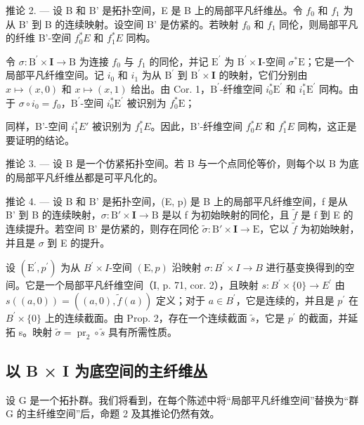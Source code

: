 推论 2. --- 设 B 和 B' 是拓扑空间，E 是 B 上的局部平凡纤维丛。令 \(f_0\) 和 \(f_1\) 为从 B' 到 B 的连续映射。设空间 B' 是仿紧的。若映射 \(f_0\) 和 \(f_1\) 同伦，则局部平凡的纤维 B'-空间 \(f_0^*E\) 和 \(f_1^*E\) 同构。

令 \(\sigma\colon\mathrm{B}^{\prime}\times\mathbf{I}\to\mathrm{B}\) 为连接 \(f_{0}\) 与 \(f_{1}\) 的同伦，并记 \(\mathrm{E}^{\prime}\) 为 \(\mathrm{B}^{\prime}\times\mathbf{I}\)-空间 \(\sigma^{*}\mathrm{E}\)；它是一个局部平凡纤维空间。记 \(i_{0}\) 和 \(i_{1}\) 为从 \(\mathrm{B}^{\prime}\) 到 \(\mathrm{B}^{\prime}\times\mathbf{I}\) 的映射，它们分别由 \(x\mapsto(x,0)\) 和 \(x\mapsto(x,1)\) 给出。由 Cor. 1，\(\mathrm{B}^{\prime}\)-纤维空间 \(i_{0}^{*}\mathrm{E}^{\prime}\) 和 \(i_{1}^{*}\mathrm{E}^{\prime}\) 同构。由于 \(\sigma\circ i_{0}=f_{0}\)，\(\mathrm{B}^{\prime}\)-空间 \(i_{0}^{*}\mathrm{E}^{\prime}\) 被识别为 \(f_{0}^{*}\mathrm{E}\)；

同样，B'-空间 \(i_{1}^{*}E'\) 被识别为 \(f_{1}^{*}E\)。因此，B'-纤维空间 \(f_{0}^{*}E\) 和 \(f_{1}^{*}E\) 同构，这正是要证明的结论。

推论 3. --- 设 B 是一个仿紧拓扑空间。若 B 与一个点同伦等价，则每个以 B 为底的局部平凡纤维丛都是可平凡化的。

推论 4. --- 设 B 和 B' 是拓扑空间，(E, p) 是 B 上的局部平凡纤维空间，f 是从 B' 到 B 的连续映射，\(\sigma: \mathrm{B}' \times \mathbf{I} \to \mathrm{B}\) 是以 f 为初始映射的同伦，且 \(\widetilde{f}\) 是 f 到 E 的连续提升。若空间 B' 是仿紧的，则存在同伦 \(\widetilde{\sigma}: \mathrm{B}' \times \mathbf{I} \to \mathrm{E}\)，它以 \(\widetilde{f}\) 为初始映射，并且是 \(\sigma\) 到 E 的提升。

设 \((\mathrm{E}^{\prime},p^{\prime})\) 为从 \(B^{\prime}\times I\)-空间 \((\mathrm{E},p)\) 沿映射 \(\sigma\colon B^{\prime}\times I\to B\) 进行基变换得到的空间。它是一个局部平凡纤维空间（I, p. 71, cor. 2），且映射 \(s\colon B^{\prime}\times\{0\}\to E^{\prime}\) 由 \(s((a,0))=((a,0),\widetilde{f}(a))\) 定义；对于 \(a\in B^{\prime}\)，它是连续的，并且是 \(p^{\prime}\) 在 \(B^{\prime}\times\{0\}\) 上的连续截面。由 Prop. 2，存在一个连续截面 \(\widetilde{s}\)，它是 \(p^{\prime}\) 的截面，并延拓 s。映射 \(\widetilde{\sigma}=\operatorname{pr}_{2}\circ\widetilde{s}\) 具有所需性质。

\subsection{以 B × I 为底空间的主纤维丛}

设 G 是一个拓扑群。我们将看到，在每个陈述中将“局部平凡纤维空间”替换为“群 G 的主纤维空间”后，命题 2 及其推论仍然有效。

